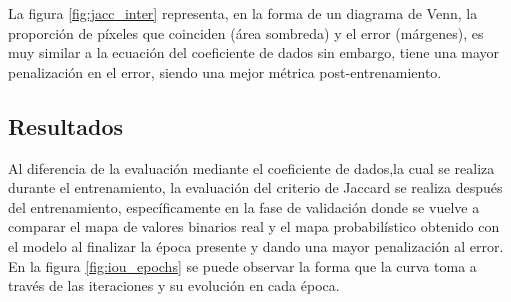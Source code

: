 La figura \ref{fig:jacc_inter} representa, en la forma de un diagrama de Venn, la proporción de píxeles que coinciden (área sombreda) y el error (márgenes), es muy similar a la ecuación del coeficiente de dados sin embargo, tiene una mayor penalización en el error, siendo una mejor métrica post-entrenamiento.

\subsection{Resultados}
Al diferencia de la evaluación mediante el coeficiente de dados,la cual se realiza durante el entrenamiento, la evaluación del criterio de Jaccard se realiza después del entrenamiento, específicamente en la fase de validación donde se vuelve a comparar el mapa de valores binarios real y el mapa probabilístico obtenido con el modelo al finalizar la época presente y dando una mayor penalización al error. En la figura \ref{fig:iou_epochs} se puede observar la forma que la curva toma a través de las iteraciones y su evolución en cada época.

